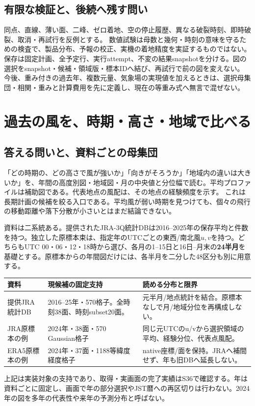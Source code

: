 \documentclass[11pt,a4paper]{article}
\begin{document}
\subsection{有限な検証と、後続へ残す問い}
同点、直線、薄い面、二峰、ゼロ着地、空の停止履歴、異なる破裂時刻、即時破裂、取消・再試行を反例とする。
数値試験は母数と幾何・時刻の意味を守るための検査で、製品分布、予報の校正、実機の着地精度を実証するものではない。
保存は固定計画、全予定行、実行attempt、不変の結果snapshotを分ける。図の選択をsnapshot・候補・領域版・標本IDへ結び、再試行で前の図を変えない。
今後、重み付きの過去年、複数元量、気象場の実現値を加えるときは、選択母集団・相関・重みと計算費用を先に定義し、現在の等重み式へ無言で混ぜない。


\clearpage
\section{過去の風を、時期・高さ・地域で比べる}\label{th:climate}
\subsection{答える問いと、資料ごとの母集団}
「どの時期の、どの高さで風が強いか」「向きがそろうか」「地域内の違いは大きいか」を、年間の高度別図・地域図・月の中央値と分位幅で読む。平均プロファイルは補助図である。代表地点の風配は、その地点の経験頻度を示す。
これは長期計画の候補を絞る入口である。平均風が弱い時期を見つけても、個々の飛行の移動距離や落下分散が小さいとはまだ結論できない。

資料は二系統ある。提供されたJRA-3Q統計DBは2016--2025年の保存平均と件数を持つ。独立した原標本束は、指定年のUTCごとの東西/南北風$u,v$を持つ。どちらもUTC 00・06・12・18時から選び、各月の1--15日と16日--月末の\textbf{24半月}を基礎とする。原標本からの年間図だけには、各半月を二分した48区分も別に用意する。
\begin{center}\small
\begin{tabular}{@{}p{43mm}p{45mm}p{67mm}@{}}
\toprule 資料 & 現候補の固定支持 & 読める分布と限界 \\\midrule
提供JRA統計DB & 2016--25年・570格子。全時刻38面、時刻subset20面。 & 元半月/地点統計を結合。原標本なしで月/地域分位を再構成しない。\\
JRA原標本の例 & 2024年・38面・570 Gaussian格子 & 同じ元UTCのu/vから選択領域の平均、経験分位、代表点風配。\\
ERA5原標本の例 & 2024年・37面・1188等緯度経度格子 & native座標/面を保持。JRAへ補間せず、年も旧DBへ延長しない。\\\bottomrule
\end{tabular}\end{center}
上記は実装対象の支持であり、取得・実画面の完了実績はS36で確認する。年は資料ごとに固定し、画面で年の部分選択やJST暦への再区切りは行わない。2024年の図を多年の代表性や来年の予測分布と呼ばない。
\end{document}
